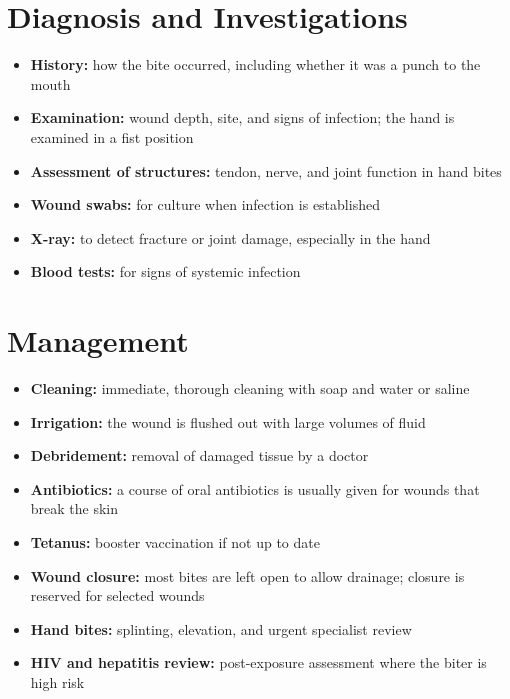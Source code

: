 \section*{Diagnosis and Investigations}
\begin{itemize}
    \item \textbf{History:} how the bite occurred, including whether it was a punch to the mouth
    \item \textbf{Examination:} wound depth, site, and signs of infection; the hand is examined in a fist position
    \item \textbf{Assessment of structures:} tendon, nerve, and joint function in hand bites
    \item \textbf{Wound swabs:} for culture when infection is established
    \item \textbf{X-ray:} to detect fracture or joint damage, especially in the hand
    \item \textbf{Blood tests:} for signs of systemic infection
\end{itemize}

\section*{Management}
\begin{itemize}
    \item \textbf{Cleaning:} immediate, thorough cleaning with soap and water or saline
    \item \textbf{Irrigation:} the wound is flushed out with large volumes of fluid
    \item \textbf{Debridement:} removal of damaged tissue by a doctor
    \item \textbf{Antibiotics:} a course of oral antibiotics is usually given for wounds that break the skin
    \item \textbf{Tetanus:} booster vaccination if not up to date
    \item \textbf{Wound closure:} most bites are left open to allow drainage; closure is reserved for selected wounds
    \item \textbf{Hand bites:} splinting, elevation, and urgent specialist review
    \item \textbf{HIV and hepatitis review:} post-exposure assessment where the biter is high risk
\end{itemize}

